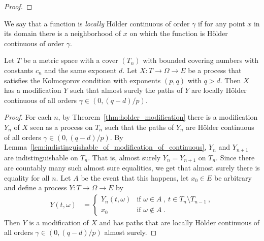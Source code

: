 \begin{proof}\leanok

\end{proof}

We say that a function is \emph{locally} Hölder continuous of order $\gamma$ if for any point $x$ in its domain there is a neighborhood of $x$ on which the function is Hölder continuous of order $\gamma$.

\begin{theorem}\label{thm:localized_holder_modification}
  \leanok
Let $T$ be a metric space with a cover $(T_n)$ with bounded covering numbers with constants $c_n$ and the same exponent $d$.
Let $X : T \to \Omega \to E$ be a process that satisfies the Kolmogorov condition with exponents $(p, q)$ with $q > d$.
Then $X$ has a modification $Y$ such that almost surely the paths of $Y$ are locally Hölder continuous of all orders $\gamma \in (0, (q - d)/p)$.
\end{theorem}

\begin{proof}\leanok
For each $n$, by Theorem~\ref{thm:holder_modification} there is a modification $Y_n$ of $X$ seen as a process on $T_n$ such that the paths of $Y_n$ are Hölder continuous of all orders $\gamma \in (0, (q - d)/p)$.
By Lemma~\ref{lem:indistinguishable_of_modification_of_continuous}, $Y_n$ and $Y_{n+1}$ are indistinguishable on $T_n$.
That is, almost surely $Y_n = Y_{n+1}$ on $T_n$.
Since there are countably many such almost sure equalities, we get that almost surely there is equality for all $n$.
Let $A$ be the event that this happens, let $x_0 \in E$ be arbitrary and define a process $Y : T \to \Omega \to E$ by
\begin{align*}
  Y(t, \omega)
  &= \begin{cases}
    Y_n(t, \omega) & \text{if } \omega \in A \: , \: t \in T_n \setminus T_{n-1} \: ,
    \\
    x_0 & \text{if } \omega \notin A \: .
  \end{cases}
\end{align*}
Then $Y$ is a modification of $X$ and has paths that are locally Hölder continuous of all orders $\gamma \in (0, (q - d)/p)$ almost surely.
\end{proof}


